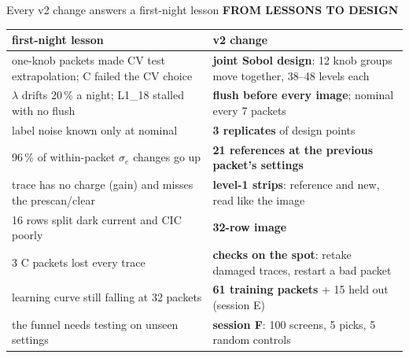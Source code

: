 \documentclass[aspectratio=169,11pt]{beamer}
\newcommand{\eyebrow}[2][trace]{{\color{#1}\scriptsize\bfseries\MakeUppercase{#2}}\par\vspace{0.1em}}
\begin{document}
\begin{frame}{Every v2 change answers a first-night lesson}
\eyebrow[image]{From lessons to design}
\scriptsize
\begin{tabular}{p{5.6cm}p{6.6cm}}\toprule
first-night lesson & v2 change\\\midrule
one-knob packets made CV test extrapolation; C failed the CV choice & \textbf{joint Sobol design}: 12 knob groups move together, 38--48 levels each\\
$\lambda$ drifts 20\,\% a night; L1\_18 stalled with no flush & \textbf{flush before every image}; nominal every 7 packets\\
label noise known only at nominal & \textbf{3 replicates} of design points\\
96\,\% of within-packet $\sigma_e$ changes go up & \textbf{21 references at the previous packet's settings}\\
trace has no charge (gain) and misses the prescan/clear & \textbf{level-1 strips}: reference and new, read like the image\\
16 rows split dark current and CIC poorly & \textbf{32-row image}\\
3 C packets lost every trace & \textbf{checks on the spot}: retake damaged traces, restart a bad packet\\
learning curve still falling at 32 packets & \textbf{61 training packets} + 15 held out (session E)\\
the funnel needs testing on unseen settings & \textbf{session F}: 100 screens, 5 picks, 5 random controls\\\bottomrule
\end{tabular}
\end{frame}
\end{document}
